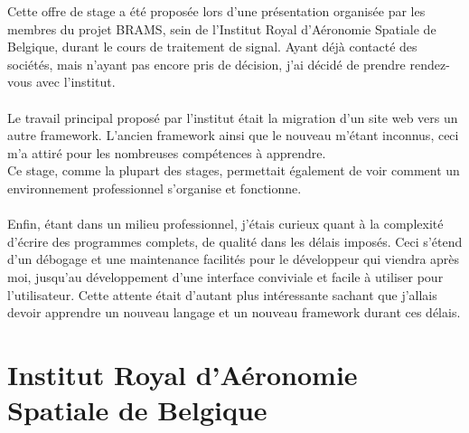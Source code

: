 \documentclass[11pt]{article}
\begin{document}
Cette offre de stage a été proposée lors d'une présentation organisée par les membres du projet BRAMS, sein de l'Institut Royal d'Aéronomie Spatiale de Belgique, durant le cours de traitement de signal.
Ayant déjà contacté des sociétés, mais n'ayant pas encore pris de décision, j'ai décidé de prendre rendez-vous avec l'institut.\\
\\
Le travail principal proposé par l'institut était la migration d'un site web vers un autre framework.
L'ancien framework ainsi que le nouveau m'étant inconnus, ceci m'a attiré pour les nombreuses compétences à apprendre.\\
Ce stage, comme la plupart des stages, permettait également de voir comment un environnement professionnel s'organise et fonctionne.\\
\\
Enfin, étant dans un milieu professionnel, j'étais curieux quant à la complexité d'écrire des programmes complets, de qualité dans les délais imposés.
Ceci s'étend d'un débogage et une maintenance facilités pour le développeur qui viendra après moi, jusqu'au développement d'une interface conviviale et facile à utiliser pour l'utilisateur.
Cette attente était d'autant plus intéressante sachant que j'allais devoir apprendre un nouveau langage et un nouveau framework durant ces délais.

\newpage

\section{Institut Royal d'Aéronomie Spatiale de Belgique}
\end{document}
